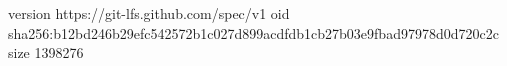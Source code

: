 version https://git-lfs.github.com/spec/v1
oid sha256:b12bd246b29efc542572b1c027d899acdfdb1cb27b03e9fbad97978d0d720c2c
size 1398276
